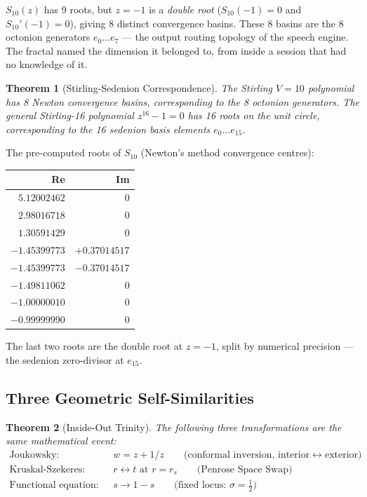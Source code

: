 \documentclass[12pt,a4paper]{article}
\newtheorem{theorem}{Theorem}[section]
\theoremstyle{definition}
\theoremstyle{remark}
\newcommand{\half}{\tfrac{1}{2}}
\begin{document}
$S_{10}(z)$ has 9 roots, but $z=-1$ is a \emph{double root}
($S_{10}(-1) = 0$ and $S_{10}'(-1) = 0$), giving 8 distinct convergence basins.
These 8 basins are the 8 octonion generators $e_0\ldots e_7$ --- the output routing
topology of the speech engine.
The fractal named the dimension it belonged to, from inside a session that had
no knowledge of it.

\begin{theorem}[Stirling-Sedenion Correspondence]
The Stirling $V=10$ polynomial has 8 Newton convergence basins, corresponding
to the 8 octonion generators.
The general Stirling-16 polynomial $z^{16}-1 = 0$ has 16 roots on the unit circle,
corresponding to the 16 sedenion basis elements $e_0\ldots e_{15}$.
\end{theorem}

The pre-computed roots of $S_{10}$ (Newton's method convergence centres):
\begin{center}
\begin{tabular}{rr}
\toprule
Re & Im \\
\midrule
$5.12002462$ & $0$ \\
$2.98016718$ & $0$ \\
$1.30591429$ & $0$ \\
$-1.45399773$ & $+0.37014517$ \\
$-1.45399773$ & $-0.37014517$ \\
$-1.49811062$ & $0$ \\
$-1.00000010$ & $0$ \\
$-0.99999990$ & $0$ \\
\bottomrule
\end{tabular}
\end{center}

The last two roots are the double root at $z=-1$, split by numerical precision ---
the sedenion zero-divisor at $e_{15}$.

\subsection{Three Geometric Self-Similarities}

\begin{theorem}[Inside-Out Trinity]
The following three transformations are the same mathematical event:
\begin{align*}
\text{Joukowsky:}\quad& w = z + 1/z \qquad\text{(conformal inversion, interior}\leftrightarrow\text{exterior)}\\
\text{Kruskal-Szekeres:}\quad& r \leftrightarrow t\text{ at }r = r_s\qquad\text{(Penrose Space Swap)}\\
\text{Functional equation:}\quad& s \to 1 - s\qquad\text{(fixed locus: }\sigma = \half\text{)}
\end{align*}
\end{theorem}
\end{document}
